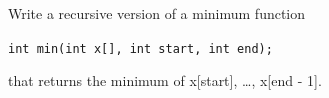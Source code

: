 Write a recursive version of a minimum function



\verb!int min(int x[], int start, int end);!



that returns the minimum of x[start], \ldots, x[end - 1].

